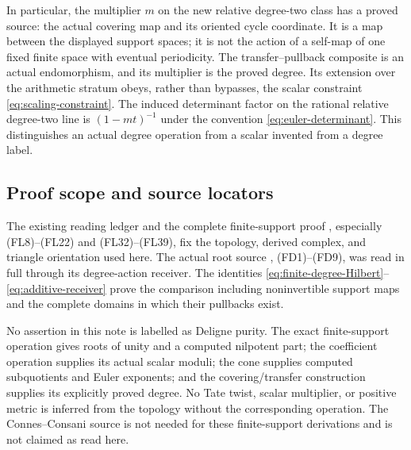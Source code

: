 In particular, the multiplier $m$ on the new relative degree-two
class has a proved source: the actual covering map and its oriented
cycle coordinate. It is a map between the displayed support spaces;
it is not the action of a self-map of one fixed finite space with
eventual periodicity. The transfer--pullback composite is an actual
endomorphism, and its multiplier is the proved degree. Its extension
over the arithmetic stratum obeys, rather than bypasses, the scalar
constraint \eqref{eq:scaling-constraint}. The induced determinant
factor on the rational relative degree-two line is $(1-mt)^{-1}$
under the convention \eqref{eq:euler-determinant}. This distinguishes
an actual degree operation from a scalar invented from a degree label.

\subsection{Proof scope and source locators}

The existing reading ledger and the complete finite-support proof
, especially (FL8)--(FL22)
and (FL32)--(FL39), fix the topology, derived complex, and triangle
orientation used here. The actual root source
,
(FD1)--(FD9), was read in full through its degree-action receiver.
The identities \eqref{eq:finite-degree-Hilbert}--\eqref{eq:additive-receiver}
prove the comparison including noninvertible support maps and the
complete domains in which their pullbacks exist.

No assertion in this note is labelled as Deligne purity. The exact
finite-support operation gives roots of unity and a computed nilpotent
part; the coefficient operation supplies its actual scalar moduli;
the cone supplies computed subquotients and Euler exponents; and the
covering/transfer construction supplies its explicitly proved degree.
No Tate twist, scalar multiplier, or positive metric is inferred from
the topology without the corresponding operation. The Connes--Consani
source is not needed for these finite-support derivations and is not
claimed as read here.

